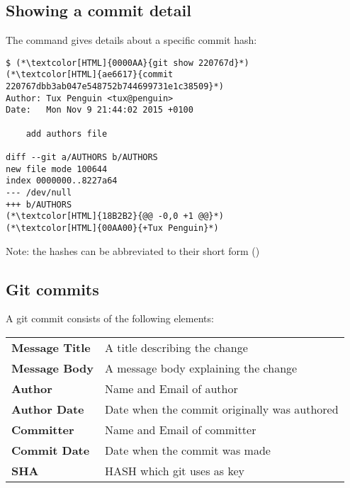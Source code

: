 \subsection{Showing a commit detail}
\begin{frame}[fragile]
  \subslidetitle
  The  command gives details about a specific commit hash:

\begin{lstlisting}
$ (*\textcolor[HTML]{0000AA}{git show 220767d}*)
(*\textcolor[HTML]{ae6617}{commit 220767dbb3ab047e548752b744699731e1c38509}*)
Author: Tux Penguin <tux@penguin>
Date:   Mon Nov 9 21:44:02 2015 +0100

    add authors file

diff --git a/AUTHORS b/AUTHORS
new file mode 100644
index 0000000..8227a64
--- /dev/null
+++ b/AUTHORS
(*\textcolor[HTML]{18B2B2}{@@ -0,0 +1 @@}*)
(*\textcolor[HTML]{00AA00}{+Tux Penguin}*)
\end{lstlisting}

  \vspace{1em}
  Note: the hashes can be abbreviated to their short form ()
\end{frame}

\subsection{Git commits}
\begin{frame}[fragile]
  \subslidetitle
  A git commit consists of the following elements:\\
  \vspace{1em}
  \begin{tabular}{lp{8cm}}
    \pause
    \textbf{Message Title} & A title describing the change \\
    \pause
    \textbf{Message Body} & A message body explaining the change \\
    \pause
    \textbf{Author} & Name and Email of author \\
    \pause
    \textbf{Author Date} & Date when the commit originally was authored \\
    \pause
    \textbf{Committer} & Name and Email of committer \\
    \pause
    \textbf{Commit Date} & Date when the commit was made \\
    \pause
    \textbf{SHA} & HASH which git uses as key \\
  \end{tabular}
\end{frame}

